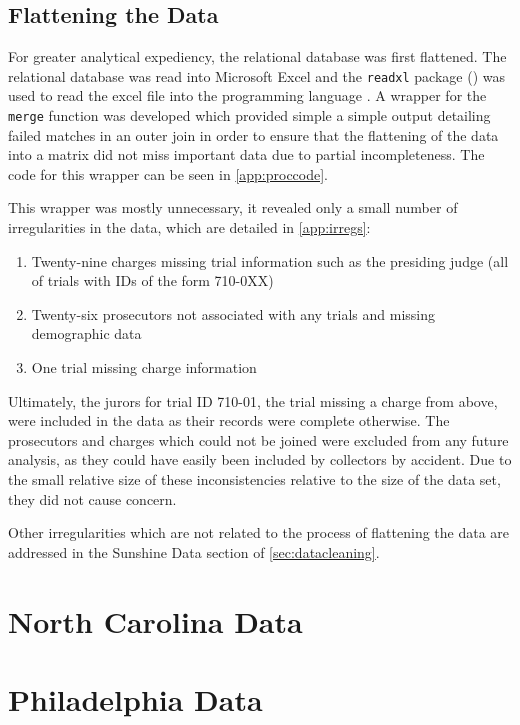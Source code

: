 \subsection{Flattening the Data}

For greater analytical expediency, the relational database was first flattened. The relational database was read into Microsoft
Excel and the \texttt{readxl} package (\cite{readxl}) was used to read the excel file into the programming language \Rp. A wrapper
for the \texttt{merge} function was developed which provided simple a simple output detailing failed matches in an outer join in
order to ensure that the flattening of the data into a matrix did not miss important data due to partial incompleteness. The code
for this wrapper can be seen in \ref{app:proccode}.

This wrapper was mostly unnecessary, it revealed only a small number of irregularities in the data, which are detailed in
\ref{app:irregs}:

\begin{enumerate}
\item Twenty-nine charges missing trial information such as the presiding judge (all of trials with IDs of the form 710-0XX)
\item Twenty-six prosecutors not associated with any trials and missing demographic data
\item One trial missing charge information
\end{enumerate}

Ultimately, the jurors for trial ID 710-01, the trial missing a charge from above, were included in the data as their records were
complete otherwise. The prosecutors and charges which could not be joined were excluded from any future analysis, as they could
have easily been included by collectors by accident. Due to the small relative size of these inconsistencies relative to the size
of the data set, they did not cause concern.

Other irregularities which are not related to the process of flattening the data are addressed in the Sunshine Data section of
\ref{sec:datacleaning}.


\section{North Carolina Data} \label{sec:norcardata}

\section{Philadelphia Data} \label{sec:phillydata}

